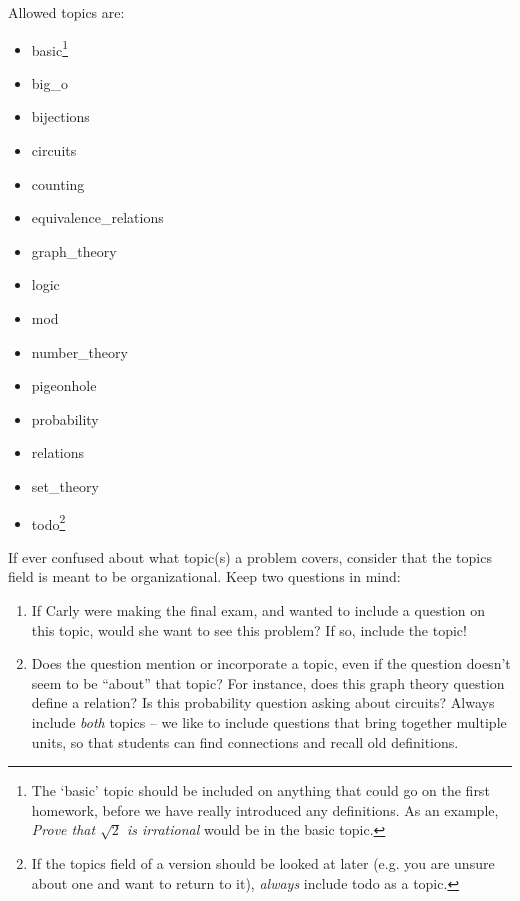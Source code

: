     Allowed topics are:
    \begin{itemize}\itemsep0pt
      \item basic\footnote{The `basic' topic should be included on 
      anything that could go on the first homework, before we have really 
      introduced any definitions. As an example, \textit{Prove that $\sqrt 
      2$ is irrational} would be in the basic topic.}
      \item big\_o
      \item bijections
      \item circuits
      \item counting
      \item equivalence\_relations
      \item graph\_theory
      \item logic
      \item mod
      \item number\_theory
      \item pigeonhole
      \item probability
      \item relations
      \item set\_theory
      \item todo\footnote{If the topics field of a version should be 
      looked at later (e.g. you are unsure about one and want to return to 
      it), \textit{always} include todo as a topic.}
    \end{itemize}
    
    If ever confused about what topic(s) a problem covers, consider that 
    the topics field is meant to be organizational. Keep two questions in mind:
    
    \begin{enumerate}[1.]\itemsep0pt
      \item If Carly were making the final exam, and wanted to include a 
      question on this topic, would she want to see this problem? If so, 
      include the topic!
      \item Does the question mention or incorporate a topic, even if the 
      question doesn't seem to be ``about'' that topic? For instance, does 
      this graph theory question define a relation? Is this probability 
      question asking about circuits? Always include \textit{both} topics 
      -- we like to include questions that bring together multiple units, 
      so that students can find connections and recall old definitions.
    \end{enumerate}
  
